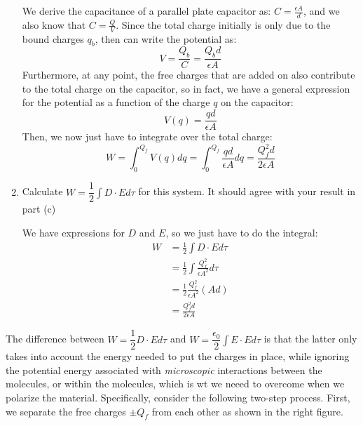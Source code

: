 \documentclass[10pt]{article}
\begin{document}
\begin{enumerate}[label=\alph*), start]
			\begin{solution}
				We derive the capacitance of a parallel plate capacitor as: $C = \frac{\epsilon A}{d}$, and 
				we also know that $C = \frac{Q}{V}$. Since the total charge initially is only due to the bound 
				charges $q_b$, then can write the potential as: 
				\[
				V = \frac{Q_b}{C} = \frac{Q_b d}{\epsilon A}
				\]
				Furthermore, at any point, the free charges that are added on also contribute to the total charge
				on the capacitor, so in fact, we have a general expression for the potential as a function of 
				the charge $q$ on the capacitor: 
				\[
				V(q) = \frac{qd}{\epsilon A}
				\] 
				Then, we now just have to integrate over the total charge: 
				\[
					W = \int_0^{Q_f} V(q) dq = \int_0^{Q_f} \frac{qd}{\epsilon A} dq = \frac{Q_f^2 d}{2 
					\epsilon A}
				\] 
			\end{solution}
		\item Calculate $W = \dfrac 12 \int D \cdot E d\tau$ for this system. It should agree with your result 
			in part (c)

			\begin{solution}
				We have expressions for $D$ and $E$, so we just have to do the integral:
				\begin{align*}
					W &= \frac{1}{2}\int D \cdot E d\tau \\
					&= \frac{1}{2} \int \frac{Q_f^2}{\epsilon A^2} d\tau \\
					&= \frac{1}{2}\frac{Q_f^2}{\epsilon A^2}(Ad) \\
					&= \frac{Q_f^2 d}{2\epsilon A}
				\end{align*}
			\end{solution}
	\end{enumerate}
	The difference between $W = \dfrac 12 D \cdot E d\tau$ and $W = \dfrac{\epsilon_0}{2}\int E \cdot E d\tau$ 
	is that the latter only takes into account the energy needed to put the charges in place, while ignoring
	the potential energy associated with \textit{microscopic} interactions between the molecules, or within the
	molecules, which is wt we neeed to overcome when we polarize the material. Specifically, consider the 
	following two-step process. First, we separate the free charges $\pm Q_f$ from each other as shown in 
	the right figure. 
\end{document}
